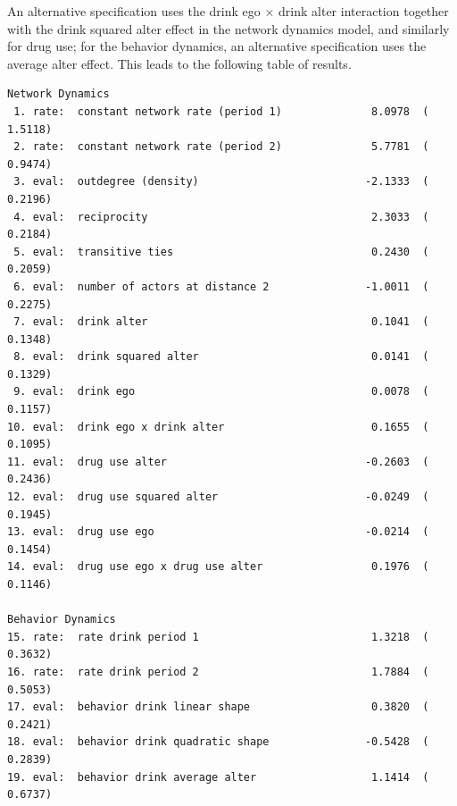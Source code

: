 \documentclass[a4paper,fleqn,11pt]{article}
\newcommand{\+}{\, + \,}
\begin{document}
An alternative specification uses the drink ego $\times$ drink alter interaction
together with the drink squared alter effect in the network dynamics model,
and similarly for drug use; for the behavior dynamics,
an alternative specification uses the average alter effect.
This leads to the following table of results.

{\footnotesize
\begin{verbatim}
Network Dynamics
 1. rate:  constant network rate (period 1)              8.0978  (   1.5118)
 2. rate:  constant network rate (period 2)              5.7781  (   0.9474)
 3. eval:  outdegree (density)                          -2.1333  (   0.2196)
 4. eval:  reciprocity                                   2.3033  (   0.2184)
 5. eval:  transitive ties                               0.2430  (   0.2059)
 6. eval:  number of actors at distance 2               -1.0011  (   0.2275)
 7. eval:  drink alter                                   0.1041  (   0.1348)
 8. eval:  drink squared alter                           0.0141  (   0.1329)
 9. eval:  drink ego                                     0.0078  (   0.1157)
10. eval:  drink ego x drink alter                       0.1655  (   0.1095)
11. eval:  drug use alter                               -0.2603  (   0.2436)
12. eval:  drug use squared alter                       -0.0249  (   0.1945)
13. eval:  drug use ego                                 -0.0214  (   0.1454)
14. eval:  drug use ego x drug use alter                 0.1976  (   0.1146)

Behavior Dynamics
15. rate:  rate drink period 1                           1.3218  (   0.3632)
16. rate:  rate drink period 2                           1.7884  (   0.5053)
17. eval:  behavior drink linear shape                   0.3820  (   0.2421)
18. eval:  behavior drink quadratic shape               -0.5428  (   0.2839)
19. eval:  behavior drink average alter                  1.1414  (   0.6737)
\end{verbatim}
}
\end{document}
